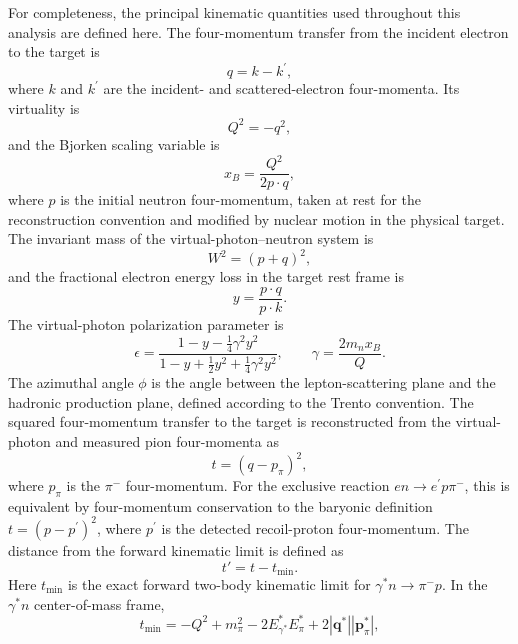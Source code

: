 For completeness, the principal kinematic quantities used throughout this analysis are defined here. The four-momentum transfer from the incident electron to the target is
\begin{equation}
    q = k-k^\prime,
\end{equation}
where $k$ and $k^\prime$ are the incident- and scattered-electron four-momenta. Its virtuality is
\begin{equation}
    Q^2=-q^2,
\end{equation}
and the Bjorken scaling variable is
\begin{equation}
    x_B=\frac{Q^2}{2p\cdot q},
\end{equation}
where $p$ is the initial neutron four-momentum, taken at rest for the reconstruction convention and modified by nuclear motion in the physical target. The invariant mass of the virtual-photon--neutron system is
\begin{equation}
    W^2=(p+q)^2,
\end{equation}
and the fractional electron energy loss in the target rest frame is
\begin{equation}
    y=\frac{p\cdot q}{p\cdot k}.
\end{equation}
The virtual-photon polarization parameter is
\begin{equation}
    \epsilon =
    \frac{1-y-\frac{1}{4}\gamma^2y^2}
         {1-y+\frac{1}{2}y^2+\frac{1}{4}\gamma^2y^2},
    \qquad
    \gamma=\frac{2m_n x_B}{Q}.
\end{equation}
The azimuthal angle $\phi$ is the angle between the lepton-scattering plane and the hadronic production plane, defined according to the Trento convention. The squared four-momentum transfer to the target is reconstructed from the virtual-photon and measured pion four-momenta as
\begin{equation}
t=(q-p_\pi)^2,
\end{equation}
where $p_\pi$ is the $\pi^-$ four-momentum. For the exclusive reaction $en\rightarrow e^\prime p\pi^-$, this is equivalent by four-momentum conservation to the baryonic definition $t=(p-p^\prime)^2$, where $p^\prime$ is the detected recoil-proton four-momentum. The distance from the forward kinematic limit is defined as
\begin{equation}
    t'=t-t_{\min}.
\end{equation}
Here $t_{\min}$ is the exact forward two-body kinematic limit for $\gamma^*n\rightarrow\pi^-p$. In the $\gamma^*n$ center-of-mass frame,
\begin{equation}
    t_{\min}
    =
    -Q^2+m_{\pi}^2
    -2E_{\gamma^*}^*E_{\pi}^*
    +2|\mathbf{q}^*||\mathbf{p}_{\pi}^*|,
\end{equation}
